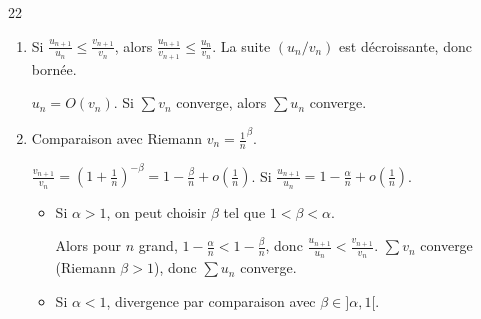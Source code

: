 \begin{correction}{22}
\begin{enumerate}
    \item Si $\frac{u_{n+1}}{u_n} \leqslant \frac{v_{n+1}}{v_n}$, alors $\frac{u_{n+1}}{v_{n+1}} \leqslant \frac{u_n}{v_n}$.
        La suite $(u_n/v_n)$ est décroissante, donc bornée.
        
        $u_n = O(v_n)$. Si $\sum v_n$ converge, alors $\sum u_n$ converge.
        
    \item Comparaison avec Riemann $v_n = \frac{1}{n}^\beta$.

        $\frac{v_{n+1}}{v_n} = \left(1+\frac{1}{n}\right)^{-\beta} = 1 - \frac{\beta}{n} + o\left(\frac{1}{n}\right)$.
        Si $\frac{u_{n+1}}{u_n} = 1 - \frac{\alpha}{n} + o(\frac{1}{n})$.
    \begin{itemize}
        \item Si $\alpha > 1$, on peut choisir $\beta$ tel que $1 < \beta < \alpha$.

            Alors pour $n$ grand, $1 - \frac{\alpha}{n} < 1 - \frac{\beta}{n}$, donc $\frac{u_{n+1}}{u_n} < \frac{v_{n+1}}{v_n}$.
            $\sum v_n$ converge (Riemann $\beta>1$), donc $\sum u_n$ converge.

        \item Si $\alpha < 1$, divergence par comparaison avec $\beta \in ]\alpha, 1[$.
    \end{itemize}
\end{enumerate}
\end{correction}

